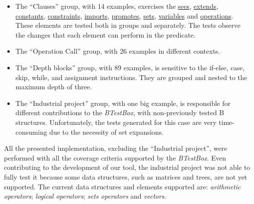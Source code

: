 \documentclass[runningheads]{llncs}
\begin{document}
\begin{itemize}
    \item The ``Clauses'' group, with 14 examples, exercises the \underline{sees}, \underline{extends}, \underline{constants}, \underline{constraints}, \underline{imports}, \underline{promotes}, \underline{sets}, \underline{variables} and \underline{operations}. These elements are tested both in groups and separately. The tests observe the changes that each element can perform in the predicate.
    
    \item The ``Operation Call'' group, with 26 examples in different contexts.
    
    \item The ``Depth blocks'' group, with 89 examples, is sensitive to the if-else, case, skip, while, and assignment instructions. They are grouped and nested to the maximum depth of three.
    
    \item The ``Industrial project'' group, with one big example, is responsible for different contributions to the \textit{BTestBox}, with non-previously tested B structures. Unfortunately, the tests generated for this case are very time-consuming due to the necessity of set expansions.
\end{itemize}


All the presented implementation, excluding the ``Industrial project'', were performed with all the coverage criteria supported by the \textit{BTestBox}. Even contributing to the development of our tool, the industrial project was not able to fully test it because some data structures, such as matrices and trees, are not yet supported. 
The current data structures and elements supported are: \textit{arithmetic operators}; \textit{logical operators};  \textit{sets operators} and \textit{vectors}.
\end{document}
